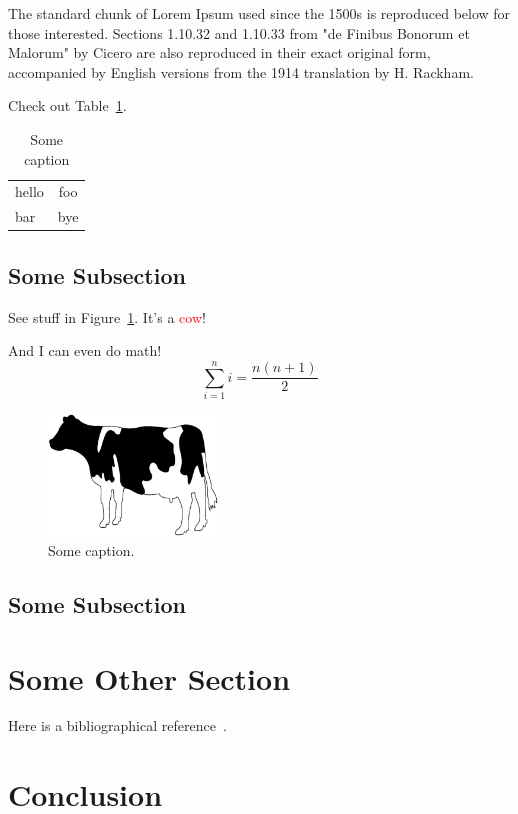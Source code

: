 \documentclass[letterpaper, 10pt, conference, compsocconf]{IEEEtran}
\begin{document}
The standard chunk of Lorem Ipsum used since the 1500s is reproduced below for those interested. 
Sections 1.10.32 and 1.10.33 from "de Finibus Bonorum et Malorum" by Cicero are also reproduced in
their exact original form, accompanied by English versions from the 1914 translation by H. Rackham.

Check out Table~\ref{tab:sometable}.

\begin{table}[ht]
\caption{Some caption}
\label{tab:sometable}
\centering
\begin{tabular}{|l|c|}
\hline
hello & foo \\
bar & bye\\
\hline
\end{tabular}
\end{table}

\subsection{Some Subsection}

See stuff in Figure~\ref{fig:somefig}. It's a \textcolor{red}{cow}!

And I can even do math!
$$
\sum_{i=1}^n i = \frac{n (n+1)}{2}
$$

\begin{figure}[t]
\centering
  \includegraphics[width=0.4\textwidth]{fig/cow.pdf}  
    \caption{Some caption.}
   \label{fig:somefig}
\end{figure}

\subsection{Some Subsection}

\section{Some Other Section}

Here is a bibliographical reference~\cite{somepaper}.

\section{Conclusion}


 
\end{document}
